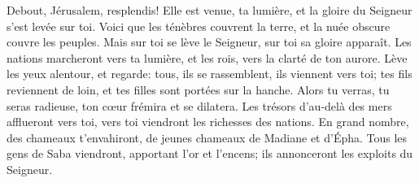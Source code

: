 Debout, Jérusalem, resplendis!
	Elle est venue, ta lumière, et la gloire du Seigneur s’est levée sur toi.
Voici que les ténèbres couvrent la terre,
	et la nuée obscure couvre les peuples.
Mais sur toi se lève le Seigneur, sur toi sa gloire apparaît.
Les nations marcheront vers ta lumière,
	et les rois, vers la clarté de ton aurore.
Lève les yeux alentour, et regarde:
	tous, ils se rassemblent, ils viennent vers toi;
	tes fils reviennent de loin, et tes filles sont portées sur la hanche.
Alors tu verras, tu seras radieuse,
	ton cœur frémira et se dilatera.
Les trésors d’au-delà des mers afflueront vers toi,
	vers toi viendront les richesses des nations.
En grand nombre, des chameaux t’envahiront,
	de jeunes chameaux de Madiane et d’Épha.
Tous les gens de Saba viendront, apportant l’or et l’encens;
	ils annonceront les exploits du Seigneur.

